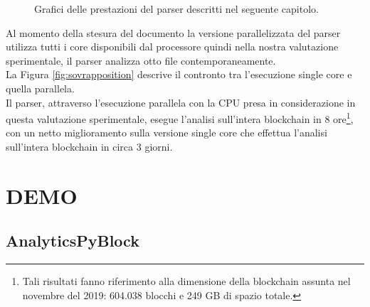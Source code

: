 \begin{figure}
	\centering
	\caption{Grafici delle prestazioni del parser descritti nel seguente capitolo.}
	\label{fig:analisisScript}
\end{figure}

Al momento della stesura del documento la versione parallelizzata del parser utilizza tutti i core disponibili dal processore quindi nella nostra valutazione sperimentale, il parser analizza otto file contemporaneamente.\\
La Figura \ref{fig:sovrapposition} descrive il contronto tra l'esecuzione single core e quella parallela.\\
Il parser, attraverso l'esecuzione parallela con la CPU presa in considerazione in questa valutazione sperimentale, esegue l'analisi sull'intera blockchain in 8 ore\footnote{Tali risultati fanno riferimento alla dimensione della blockchain assunta nel novembre del 2019: 604.038 blocchi e 249 GB di spazio totale.}, con un netto miglioramento sulla versione single core che effettua l'analisi sull'intera blockchain in circa 3 giorni.

\section{DEMO} \label{sec:solDemo}

\subsection{AnalyticsPyBlock} \label{sec:AnalyticsPyBlock}

